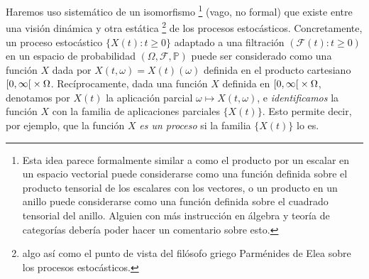 \documentclass{report}
\newcommand{\leftOpenInterval}{\left]}
\newcommand{\rightOpenInterval}{\right[}
\newcommand{\leftClosedInterval}{\left[}
\newcommand{\rightClosedInterval}{\right]}
\newcommand{\interval}[3]{%
    \ifstrequal{#1}{oo}{%
      \leftOpenInterval #2, #3 \rightOpenInterval%
    }{%
      \ifstrequal{#1}{co}{%
        \leftClosedInterval #2, #3 \rightOpenInterval%
      }{%
        \ifstrequal{#1}{oc}{
          \leftOpenInterval #2, #3 \rightClosedInterval%
        }{%
          \ifstrequal{#1}{cc}{
            \leftClosedInterval #2, #3 \rightClosedInterval
          }{%
          }%
        }%
      }%
    }%
  }
\newcommand{\prob}{\mathbb{P}}
\newcommand{\events}{\mathcal{F}}
\theoremstyle{plain}
\theoremstyle{remark}
\theoremstyle{definition}
\begin{document}
Haremos uso sistemático de un isomorfismo%
\footnote{Esta idea parece formalmente similar a como el producto por un escalar en un espacio vectorial puede considerarse como una función definida sobre el producto tensorial de los escalares con los vectores, o un producto en un anillo puede considerarse como una función definida sobre el cuadrado tensorial del anillo.
Alguien con más instrucción en álgebra y teoría de categorías debería poder hacer un comentario sobre esto.}
(vago, no formal) que existe entre una visión dinámica y otra estática%
\footnote{algo así como el punto de vista del filósofo griego Parménides de Elea sobre los procesos estocásticos.}
de los procesos estocásticos.
Concretamente, un proceso estocástico \(\{X(t) : t \geq 0\}\) adaptado a una filtración \((\events(t) : t \geq 0)\) en un espacio de probabilidad \((\Omega, \events, \prob)\) puede ser considerado como una función \(X\) dada por \(X(t, \omega) = X(t)(\omega)\) definida en el producto cartesiano \(\interval{co}{0}{\infty} \times \Omega\).
Recíprocamente, dada una función \(X\) definida en \(\interval{co}{0}{\infty} \times \Omega\), denotamos por \(X(t)\) la aplicación parcial \(\omega \mapsto X(t, \omega)\), e \emph{identificamos} la función \(X\) con la familia de aplicaciones parciales \(\{X(t)\}\).
Esto permite decir, por ejemplo, que la función \(X\) \emph{es un proceso} si la familia \(\{X(t)\}\) lo es.


\end{document}

